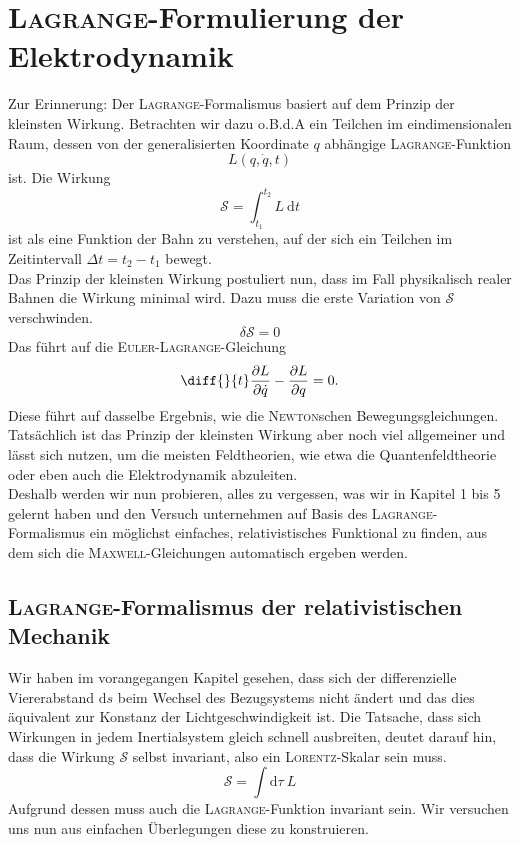 \chapter{\textsc{Lagrange}-Formulierung der Elektrodynamik}

Zur Erinnerung: Der \textsc{Lagrange}-Formalismus basiert auf dem Prinzip der kleinsten Wirkung. Betrachten wir dazu o.B.d.A ein Teilchen im eindimensionalen Raum, dessen von der generalisierten Koordinate $q$ abhängige \textsc{Lagrange}-Funktion
\begin{equation*}
L(q,\dot{q},t)
\end{equation*}
ist. Die Wirkung
\begin{equation*}
\mathcal{S} = \int_{t_1}^{t_2}L\ \mathrm{d}t
\end{equation*}
ist als eine Funktion der Bahn zu verstehen, auf der sich ein Teilchen im Zeitintervall $\Delta t = t_2-t_1$ bewegt. \\
Das Prinzip der kleinsten Wirkung postuliert nun, dass im Fall physikalisch realer Bahnen die Wirkung minimal wird. Dazu muss die erste Variation von $\mathcal{S}$ verschwinden.
\begin{equation*}
\delta\mathcal{S} = 0
\end{equation*}
Das führt auf die \textsc{Euler-Lagrange}-Gleichung
\begin{equation*}
\diff{}{t}\frac{\partial L}{\partial \dot{q}} - \frac{\partial L}{\partial q} = 0.
\end{equation*}
Diese führt auf dasselbe Ergebnis, wie die \textsc{Newton}schen Bewegungsgleichungen. Tatsächlich ist das Prinzip der kleinsten Wirkung aber noch viel allgemeiner und lässt sich nutzen, um die meisten Feldtheorien, wie etwa die Quantenfeldtheorie oder eben auch die Elektrodynamik abzuleiten. \\
Deshalb werden wir nun probieren, alles zu vergessen, was wir in Kapitel 1 bis 5 gelernt haben und den Versuch unternehmen auf Basis des \textsc{Lagrange}-Formalismus ein möglichst einfaches, relativistisches Funktional zu finden, aus dem sich die \textsc{Maxwell}-Gleichungen automatisch ergeben werden.

\section{\textsc{Lagrange}-Formalismus der relativistischen Mechanik}

Wir haben im vorangegangen Kapitel gesehen, dass sich der differenzielle Viererabstand $\mathrm{d}s$ beim Wechsel des Bezugsystems nicht ändert und das dies äquivalent zur Konstanz der Lichtgeschwindigkeit ist. Die Tatsache, dass sich Wirkungen in jedem Inertialsystem gleich schnell ausbreiten, deutet darauf hin, dass die Wirkung $\mathcal{S}$ selbst invariant, also ein \textsc{Lorentz}-Skalar sein muss.
\begin{equation*}
\mathcal{S}=\int\mathrm{d}\tau\ L
\end{equation*}
Aufgrund dessen muss auch die \textsc{Lagrange}-Funktion invariant sein. Wir versuchen uns nun aus einfachen Überlegungen diese zu konstruieren.\\

